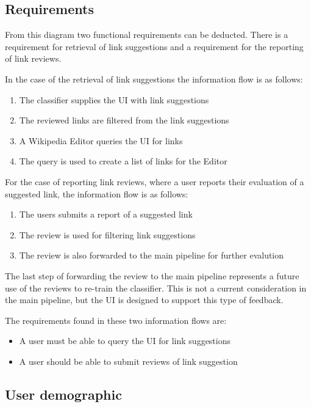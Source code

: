 \subsection{Requirements}

From this diagram two functional requirements can be deducted. There is a requirement for retrieval of link suggestions and a requirement for the reporting of link reviews.

In the case of the retrieval of link suggestions the information flow is as follows:

\begin{enumerate}
	\item The classifier supplies the UI with link suggestions
	\item The reviewed links are filtered from the link suggestions
	\item A Wikipedia Editor queries the UI for links
	\item The query is used to create a list of links for the Editor
\end{enumerate}

For the case of reporting link reviews, where a user reports their evaluation of a suggested link, the information flow is as follows:

\begin{enumerate}
	\item The users submits a report of a suggested link
	\item The review is used for filtering link suggestions
	\item The review is also forwarded to the main pipeline for further evalution
\end{enumerate}

The last step of forwarding the review to the main pipeline represents a future use of the reviews to re-train the classifier. This is not a current consideration in the main pipeline, but the UI is designed to support this type of feedback.

The requirements found in these two information flows are:

\begin{itemize}
	\item A user must be able to query the UI for link suggestions
	\item A user should be able to submit reviews of link suggestion
\end{itemize}

\subsection{User demographic}

